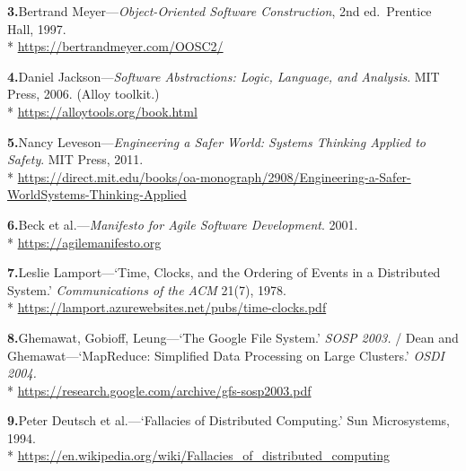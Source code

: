 \documentclass[11pt, a4paper]{article}
\begin{document}
\noindent\textbf{3.}\enspace Bertrand Meyer---\textit{Object-Oriented Software
Construction}, 2nd ed.\ Prentice Hall, 1997.\\*
{\fontsize{8}{10}\selectfont\color{midb}
\href{https://bertrandmeyer.com/OOSC2/}{https://bertrandmeyer.com/OOSC2/}}


\noindent\textbf{4.}\enspace Daniel Jackson---\textit{Software Abstractions: Logic,
Language, and Analysis}. MIT Press, 2006. (Alloy toolkit.)\\*
{\fontsize{8}{10}\selectfont\color{midb}
\href{https://alloytools.org/book.html}{https://alloytools.org/book.html}}


\noindent\textbf{5.}\enspace Nancy Leveson---\textit{Engineering a Safer World: Systems
Thinking Applied to Safety}. MIT Press, 2011.\\*
{\fontsize{8}{10}\selectfont\color{midb}
\href{https://direct.mit.edu/books/oa-monograph/2908/Engineering-a-Safer-WorldSystems-Thinking-Applied}{https://direct.mit.edu/books/oa-monograph/2908/Engineering-a-Safer-WorldSystems-Thinking-Applied}}


\noindent\textbf{6.}\enspace Beck et al.---\textit{Manifesto for Agile Software
Development}. 2001.\\*
{\fontsize{8}{10}\selectfont\color{midb}
\href{https://agilemanifesto.org}{https://agilemanifesto.org}}


\noindent\textbf{7.}\enspace Leslie Lamport---`Time, Clocks, and the Ordering of Events
in a Distributed System.' \textit{Communications of the ACM} 21(7), 1978.\\*
{\fontsize{8}{10}\selectfont\color{midb}
\href{https://lamport.azurewebsites.net/pubs/time-clocks.pdf}{https://lamport.azurewebsites.net/pubs/time-clocks.pdf}}


\noindent\textbf{8.}\enspace Ghemawat, Gobioff, Leung---`The Google File System.'
\textit{SOSP 2003.} / Dean and Ghemawat---`MapReduce: Simplified Data Processing on
Large Clusters.' \textit{OSDI 2004.}\\*
{\fontsize{8}{10}\selectfont\color{midb}
\href{https://research.google.com/archive/gfs-sosp2003.pdf}{https://research.google.com/archive/gfs-sosp2003.pdf}}


\noindent\textbf{9.}\enspace Peter Deutsch et al.---`Fallacies of Distributed
Computing.' Sun Microsystems, 1994.\\*
{\fontsize{8}{10}\selectfont\color{midb}
\href{https://en.wikipedia.org/wiki/Fallacies_of_distributed_computing}{https://en.wikipedia.org/wiki/Fallacies\_of\_distributed\_computing}}
\end{document}
